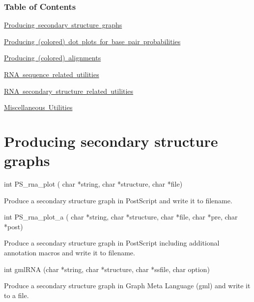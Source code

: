 \label{mp_utils_toc}%
%
 \subsubsection*{Table of Contents}





\begin{DoxyItemize}
\item \mbox{\hyperlink{mp_utils_utils_ss}{Producing secondary structure graphs}} \item \mbox{\hyperlink{mp_utils_utils_dot}{Producing (colored) dot plots for base pair probabilities}} \item \mbox{\hyperlink{mp_utils_utils_aln}{Producing (colored) alignments}} \item \mbox{\hyperlink{mp_utils_utils_seq}{R\+NA sequence related utilities}} \item \mbox{\hyperlink{mp_utils_utils_struc}{R\+NA secondary structure related utilities}} \item \mbox{\hyperlink{mp_utils_utils_misc}{Miscellaneous Utilities}}\end{DoxyItemize}


\hypertarget{mp_utils_utils_ss}{}\section{Producing secondary structure graphs}\label{mp_utils_utils_ss}
\begin{DoxyVerb}int PS_rna_plot ( char *string,
                  char *structure,
                  char *file)
\end{DoxyVerb}
 Produce a secondary structure graph in Post\+Script and write it to \textquotesingle{}filename\textquotesingle{}.

\begin{DoxyVerb}int PS_rna_plot_a (
            char *string,
            char *structure,
            char *file,
            char *pre,
            char *post)
\end{DoxyVerb}
 Produce a secondary structure graph in Post\+Script including additional annotation macros and write it to \textquotesingle{}filename\textquotesingle{}.

\begin{DoxyVerb}int gmlRNA (char *string,
            char *structure,
            char *ssfile,
            char option)
\end{DoxyVerb}
 Produce a secondary structure graph in Graph Meta Language (gml) and write it to a file.

